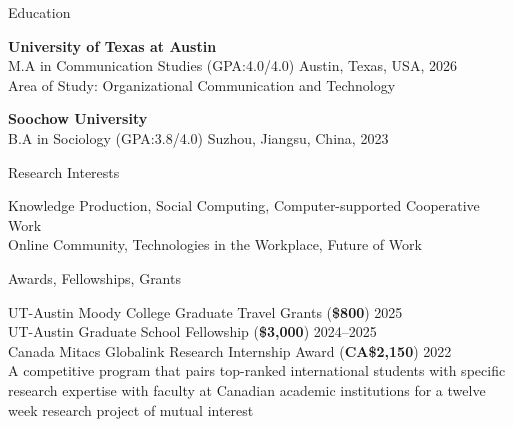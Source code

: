 \documentclass[
	11pt, %
]{resume} %
\begin{document}

\begin{rSection}{Education}
	
	\textbf{University of Texas at Austin}\\ 
	M.A in Communication Studies (GPA:4.0/4.0) \hfill Austin, Texas, USA, 2026 \\
	Area of Study: Organizational Communication and Technology 

    \textbf{Soochow University} \\
	B.A in Sociology (GPA:3.8/4.0) \hfill Suzhou, Jiangsu, China, 2023 
	
\end{rSection}

\begin{rSection}{Research Interests}

Knowledge Production, Social Computing, Computer-supported Cooperative Work\\
Online Community, Technologies in the Workplace, Future of Work

\end{rSection}


\begin{rSection}{Awards, Fellowships, Grants}
	
	UT-Austin Moody College Graduate Travel Grants (\textbf{\$800})  \hfill 2025\\
	UT-Austin Graduate School Fellowship   (\textbf{\$3,000})  \hfill 2024--2025\\
    Canada Mitacs Globalink Research Internship Award     (\textbf{CA\$2,150})  \hfill 2022\\
\textbullet\enspace  A competitive program that pairs top-ranked international students with specific research expertise with faculty at Canadian academic institutions for a twelve week research project of mutual interest
	
\end{rSection}
\end{document}
